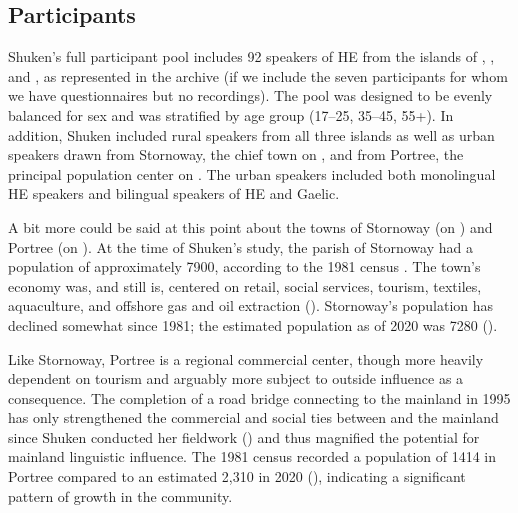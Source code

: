 \documentclass[output=paper,colorlinks,citecolor=brown]{langscibook}
\begin{document}
\subsection{Participants}

Shuken’s full participant pool includes 92 speakers of HE from the islands of , , and , as represented in the archive (if we include the seven participants for whom we have questionnaires but no recordings). The pool was designed to be evenly balanced for sex and was stratified by age group (17--25, 35--45, 55+). In addition, Shuken included rural speakers from all three islands as well as urban speakers drawn from Stornoway, the chief town on , and from Portree, the principal population center on . The urban speakers included both monolingual HE speakers and bilingual speakers of HE and Gaelic.

A bit more could be said at this point about the towns of Stornoway (on ) and Portree (on ). At the time of Shuken’s study, the parish of Stornoway had a population of approximately 7900, according to the 1981 census \citep{Shuken:1985}. The town’s economy was, and still is, centered on retail, social services, tourism, textiles, aquaculture, and offshore gas and oil extraction (\citealt{HIE:2020}). Stornoway’s population has declined somewhat since 1981; the estimated population as of 2020 was 7280 (\citealt{NationalRecordsofScotland:2023}).

Like Stornoway, Portree is a regional commercial center, though more heavily dependent on tourism and arguably more subject to outside influence as a consequence. The completion of a road bridge connecting  to the mainland in 1995 has only strengthened the commercial and social ties between  and the mainland since Shuken conducted her fieldwork (\citealt{HIE:2007}) and thus magnified the potential for mainland linguistic influence. The 1981 census recorded a population of 1414 in Portree compared to an estimated 2,310 in 2020 (\citealt{NationalRecordsofScotland:2023}), indicating a significant pattern of growth in the community.
\end{document}

